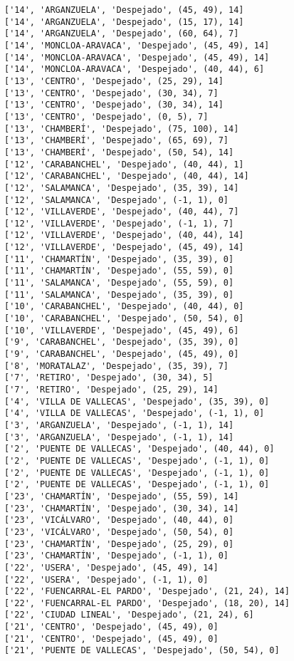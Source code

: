 \documentclass[11pt]{article}
\begin{document}
\begin{Verbatim}[commandchars=\\\{\}]
['14', 'ARGANZUELA', 'Despejado', (45, 49), 14]
['14', 'ARGANZUELA', 'Despejado', (15, 17), 14]
['14', 'ARGANZUELA', 'Despejado', (60, 64), 7]
['14', 'MONCLOA-ARAVACA', 'Despejado', (45, 49), 14]
['14', 'MONCLOA-ARAVACA', 'Despejado', (45, 49), 14]
['14', 'MONCLOA-ARAVACA', 'Despejado', (40, 44), 6]
['13', 'CENTRO', 'Despejado', (25, 29), 14]
['13', 'CENTRO', 'Despejado', (30, 34), 7]
['13', 'CENTRO', 'Despejado', (30, 34), 14]
['13', 'CENTRO', 'Despejado', (0, 5), 7]
['13', 'CHAMBERÍ', 'Despejado', (75, 100), 14]
['13', 'CHAMBERÍ', 'Despejado', (65, 69), 7]
['13', 'CHAMBERÍ', 'Despejado', (50, 54), 14]
['12', 'CARABANCHEL', 'Despejado', (40, 44), 1]
['12', 'CARABANCHEL', 'Despejado', (40, 44), 14]
['12', 'SALAMANCA', 'Despejado', (35, 39), 14]
['12', 'SALAMANCA', 'Despejado', (-1, 1), 0]
['12', 'VILLAVERDE', 'Despejado', (40, 44), 7]
['12', 'VILLAVERDE', 'Despejado', (-1, 1), 7]
['12', 'VILLAVERDE', 'Despejado', (40, 44), 14]
['12', 'VILLAVERDE', 'Despejado', (45, 49), 14]
['11', 'CHAMARTÍN', 'Despejado', (35, 39), 0]
['11', 'CHAMARTÍN', 'Despejado', (55, 59), 0]
['11', 'SALAMANCA', 'Despejado', (55, 59), 0]
['11', 'SALAMANCA', 'Despejado', (35, 39), 0]
['10', 'CARABANCHEL', 'Despejado', (40, 44), 0]
['10', 'CARABANCHEL', 'Despejado', (50, 54), 0]
['10', 'VILLAVERDE', 'Despejado', (45, 49), 6]
['9', 'CARABANCHEL', 'Despejado', (35, 39), 0]
['9', 'CARABANCHEL', 'Despejado', (45, 49), 0]
['8', 'MORATALAZ', 'Despejado', (35, 39), 7]
['7', 'RETIRO', 'Despejado', (30, 34), 5]
['7', 'RETIRO', 'Despejado', (25, 29), 14]
['4', 'VILLA DE VALLECAS', 'Despejado', (35, 39), 0]
['4', 'VILLA DE VALLECAS', 'Despejado', (-1, 1), 0]
['3', 'ARGANZUELA', 'Despejado', (-1, 1), 14]
['3', 'ARGANZUELA', 'Despejado', (-1, 1), 14]
['2', 'PUENTE DE VALLECAS', 'Despejado', (40, 44), 0]
['2', 'PUENTE DE VALLECAS', 'Despejado', (-1, 1), 0]
['2', 'PUENTE DE VALLECAS', 'Despejado', (-1, 1), 0]
['2', 'PUENTE DE VALLECAS', 'Despejado', (-1, 1), 0]
['23', 'CHAMARTÍN', 'Despejado', (55, 59), 14]
['23', 'CHAMARTÍN', 'Despejado', (30, 34), 14]
['23', 'VICÁLVARO', 'Despejado', (40, 44), 0]
['23', 'VICÁLVARO', 'Despejado', (50, 54), 0]
['23', 'CHAMARTÍN', 'Despejado', (25, 29), 0]
['23', 'CHAMARTÍN', 'Despejado', (-1, 1), 0]
['22', 'USERA', 'Despejado', (45, 49), 14]
['22', 'USERA', 'Despejado', (-1, 1), 0]
['22', 'FUENCARRAL-EL PARDO', 'Despejado', (21, 24), 14]
['22', 'FUENCARRAL-EL PARDO', 'Despejado', (18, 20), 14]
['22', 'CIUDAD LINEAL', 'Despejado', (21, 24), 6]
['21', 'CENTRO', 'Despejado', (45, 49), 0]
['21', 'CENTRO', 'Despejado', (45, 49), 0]
['21', 'PUENTE DE VALLECAS', 'Despejado', (50, 54), 0]

\end{Verbatim}
\end{document}
